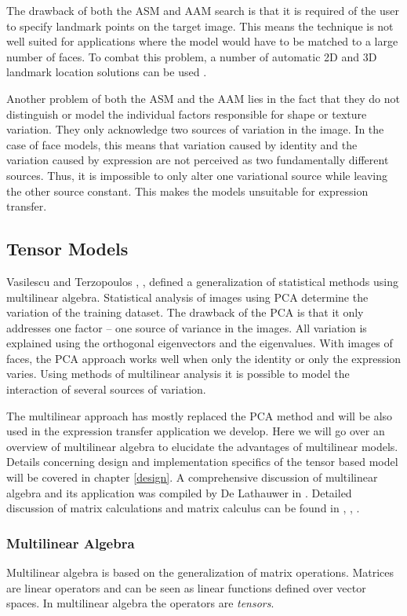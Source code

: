 \documentclass[11pt,a4paper]{report}
\begin{document}
The drawback of both the ASM and AAM search is that it is required of the user to specify
landmark points on the target image. This means the technique is not well suited
for applications where the model would have to be matched to a large number of
faces. To combat this problem, a number of automatic 2D and 3D landmark location
solutions can be used \cite{activeApp04}.

Another problem of both the ASM and the AAM lies in the fact that they do not
distinguish or model the individual factors responsible for shape or texture
variation. They only acknowledge two sources of variation in the image. In the
case of face models, this means that variation caused by
identity and the variation caused by expression are not perceived as two
fundamentally different sources. Thus, it is impossible to only alter one
variational source while leaving the other source constant. This makes the
models unsuitable for expression transfer.

\subsection{Tensor Models}
Vasilescu and Terzopoulos \cite{Ter1}, \cite{Ter2}, \cite{Ter3} defined a
generalization of statistical methods using multilinear algebra. Statistical
analysis of images using PCA determine the variation of the training
dataset. The drawback of the PCA is that it only addresses one factor -- one
source of variance in the images. All variation is explained using the
orthogonal eigenvectors and the eigenvalues. With images of faces, the PCA
approach works well when only the identity or only the expression varies. Using
methods of multilinear analysis it is possible to model the interaction of
several sources of variation.

The multilinear approach has mostly replaced the PCA method and will be also used in the
expression transfer application we develop. Here we will go over an overview of
multilinear algebra to elucidate the advantages of multilinear
models. Details concerning design and implementation specifics of the tensor
based model will be covered
in chapter \ref{design}. A comprehensive discussion of multilinear algebra and
its application was compiled by De Lathauwer in \cite{multilinear}. Detailed
discussion of matrix calculations and matrix calculus can be found in \cite{matcalc}, \cite{matrix}, \cite{kronecker}.

\subsubsection{Multilinear Algebra}
Multilinear algebra is based on the generalization of matrix
operations. Matrices are linear operators and can be seen as linear functions
defined over vector spaces. In multilinear algebra the operators are
\textit{tensors}. 
\end{document}
